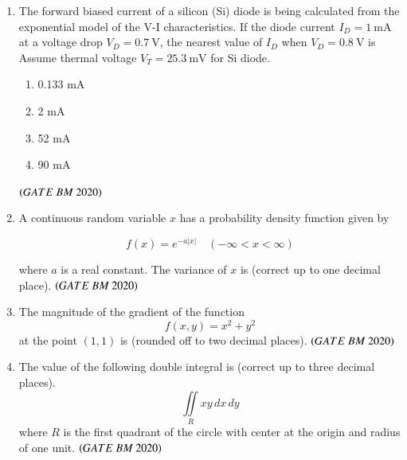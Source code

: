 \documentclass[journal,12pt,onecolumn]{IEEEtran}
\theoremstyle{remark}
\begin{document}
\begin{enumerate}
\item The forward biased current of a silicon (Si) diode is being calculated from the 
exponential model of the V-I characteristics. If the diode current $I_D = 1 \ \text{mA}$ 
at a voltage drop $V_D = 0.7 \ \text{V}$, the nearest value of $I_D$ when 
$V_D = 0.8 \ \text{V}$ is\\

Assume thermal voltage $V_T = 25.3 \ \text{mV}$ for Si diode.
\begin{enumerate}[label=\alph*)] 
\item\hspace{0.5cm}0.133 mA
\item\hspace{0.5cm}2 mA
\item\hspace{0.5cm}52 mA
\item\hspace{0.5cm}90 mA
\end{enumerate}
 \hfill $\brak{GATE\ BM\ 2020}$\\
 
\item A continuous random variable $x$ has a probability density function given by  

\[
f(x) = e^{-a|x|} \quad (-\infty < x < \infty)
\]

where $a$ is a real constant. The variance of $x$ is \underline{\hspace{2cm}} 
(correct up to one decimal place). 
\hfill $\brak{GATE\ BM\ 2020}$\\

\item The magnitude of the gradient of the function 
\[
f(x, y) = x^{2} + y^{2}
\]
at the point $(1,1)$ is \underline{\hspace{2cm}}  (rounded off to two decimal places). \hfill $\brak{GATE\ BM\ 2020}$\\

\item The value of the following double integral is \underline{\hspace{2cm}} 
(correct up to three decimal places).
\[
\iint\limits_{R} xy \, dx \, dy
\]
where $R$ is the first quadrant of the circle with center at the origin and radius of one unit. \hfill $\brak{GATE\ BM\ 2020}$\\


\end{enumerate}
\end{document}
